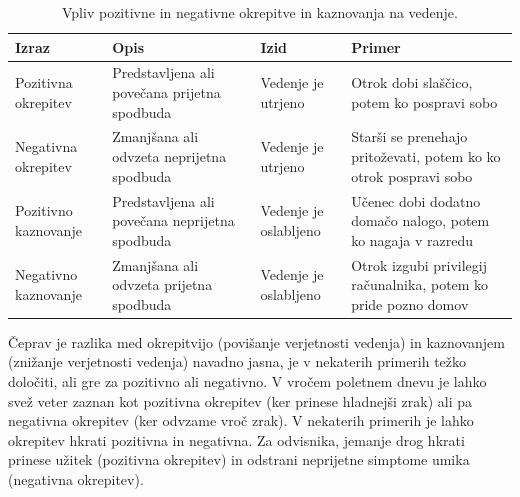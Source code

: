 \documentclass[a4paper, oneside, 12pt]{report}
\begin{document}
\begin{table}[htbp]
\begin{tabulary}{\textwidth}{| L | L | L | L |}
\hline
\textbf{Izraz} & \textbf{Opis} & \textbf{Izid} & \textbf{Primer} \\ \hline
Pozitivna okrepitev & Predstavljena ali povečana prijetna spodbuda & Vedenje je utrjeno & Otrok dobi slaščico, potem ko pospravi sobo \\ \hline
Negativna okrepitev & Zmanjšana ali odvzeta neprijetna spodbuda & Vedenje je utrjeno & Starši se prenehajo pritoževati, potem ko ko otrok pospravi sobo \\ \hline
Pozitivno kaznovanje & Predstavljena ali povečana neprijetna spodbuda & Vedenje je oslabljeno & Učenec dobi dodatno domačo nalogo, potem ko nagaja v razredu \\ \hline
Negativno kaznovanje & Zmanjšana ali odvzeta prijetna spodbuda & Vedenje je oslabljeno & Otrok izgubi privilegij računalnika, potem ko pride pozno domov \\ \hline
\end{tabulary}
\caption{Vpliv pozitivne in negativne okrepitve in kaznovanja na vedenje.}
\label{table:OperantConditioningTerms}
\end{table}

Čeprav je razlika med okrepitvijo (povišanje verjetnosti vedenja) in kaznovanjem (znižanje verjetnosti vedenja) navadno jasna, je v nekaterih primerih težko določiti, ali gre za pozitivno ali negativno. V vročem poletnem dnevu je lahko svež veter zaznan kot pozitivna okrepitev (ker prinese hladnejši zrak) ali pa negativna okrepitev (ker odvzame vroč zrak). V nekaterih primerih je lahko okrepitev hkrati pozitivna in negativna. Za odvisnika, jemanje drog hkrati prinese užitek (pozitivna okrepitev) in odstrani neprijetne simptome umika (negativna okrepitev).~\cite{IntroductionToPsychology}
\end{document}

